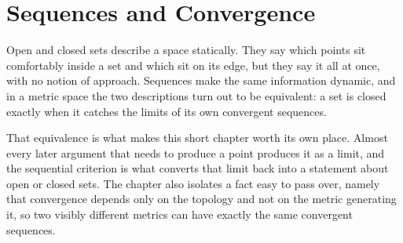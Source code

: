 \chapter{Sequences and Convergence}
\label{ch:sequences}

Open and closed sets describe a space statically. They say which points sit comfortably inside a
set and which sit on its edge, but they say it all at once, with no notion of approach. Sequences
make the same information dynamic, and in a metric space the two descriptions turn out to be
equivalent: a set is closed exactly when it catches the limits of its own convergent sequences.

That equivalence is what makes this short chapter worth its own place. Almost every later
argument that needs to produce a point produces it as a limit, and the sequential criterion is
what converts that limit back into a statement about open or closed sets. The chapter also
isolates a fact easy to pass over, namely that convergence depends only on the topology and not
on the metric generating it, so two visibly different metrics can have exactly the same
convergent sequences.


